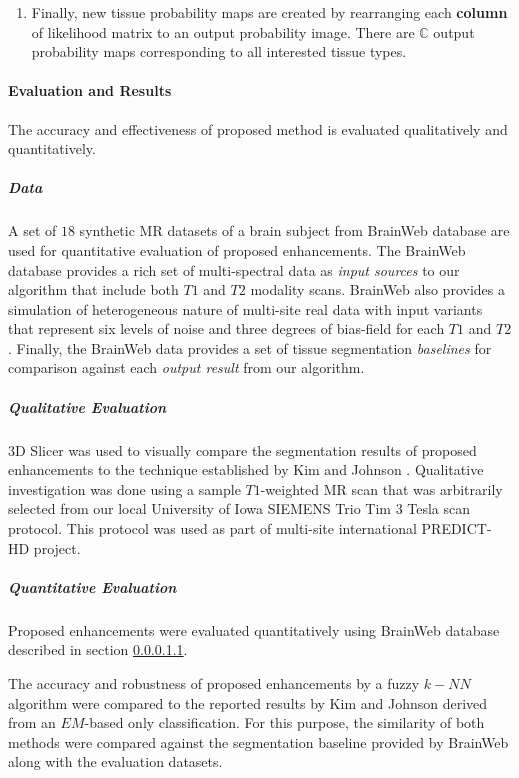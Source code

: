 \begin{enumerate}
\item Finally, new tissue probability maps are created by rearranging each \textbf{column} of likelihood matrix to an output probability image. There are $\mathbb{C}$ output probability maps corresponding to all interested tissue types.
\end{enumerate}

\paragraph{Evaluation and Results} %

The accuracy and effectiveness of proposed method is evaluated qualitatively and quantitatively.

\subparagraph{Data} %
\label{brainWebData}

A set of $18$ synthetic MR datasets of a brain subject from BrainWeb database \cite{Cocosco1997} are used for quantitative evaluation of proposed enhancements.
The BrainWeb database provides a rich set of multi-spectral data as \textit{input sources} to our algorithm that include both $T1$ and $T2$ modality scans. BrainWeb also provides a simulation of heterogeneous nature of multi-site real data with input variants that represent six levels of noise and three degrees of bias-field for each $T1$ and $T2$.
Finally, the BrainWeb data provides a set of tissue segmentation \textit{baselines} for comparison against each \textit{output result} from our algorithm.

\subparagraph{Qualitative Evaluation} %

3D Slicer \cite{slicer_paper} was used to visually compare the segmentation results of proposed enhancements to the technique established by Kim and Johnson \cite{Kim2013}.
Qualitative investigation was done using a sample $T1$-weighted MR scan that was arbitrarily selected from our local University of Iowa SIEMENS Trio Tim $3$ Tesla scan protocol.  This protocol was used as part of multi-site international PREDICT-HD \cite{PREDICTHD} project.

\subparagraph{Quantitative Evaluation} %

Proposed enhancements were evaluated quantitatively using BrainWeb database described in section \ref{brainWebData}.

The accuracy and robustness of proposed enhancements by a fuzzy $k-NN$ algorithm were compared to the reported results by Kim and Johnson \cite{Kim2013} derived from an $EM$-based only classification. For this purpose, the similarity of both methods were compared against the segmentation baseline provided by BrainWeb along with the evaluation datasets.

